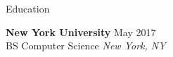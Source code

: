 \documentclass{resume} %
\begin{document}




\begin{rSection}{Education}

{\bf New York University} \hfill  May 2017 \\
BS Computer Science \hfill {\em New York, NY}
\end{rSection}

\end{document}
